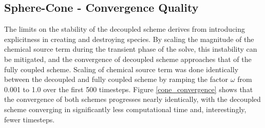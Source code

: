 \subsection{Sphere-Cone - Convergence Quality}

The limits on the stability of the decoupled scheme derives from introducing
explicitness in creating and destroying species.  By scaling the magnitude of
the chemical source term during the transient phase of the solve, this
instability can be mitigated, and the convergence of decoupled scheme approaches
that of the fully coupled scheme. Scaling of chemical source term was done
identically between the decoupled and fully coupled scheme by ramping the
factor $\omega$ from 0.001 to 1.0 over the first 500 timesteps. Figure
\ref{cone_convergence} shows that the convergence of both schemes progresses
nearly identically, with the decoupled scheme converging in significantly less
computational time and, interestingly, fewer timesteps.

